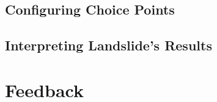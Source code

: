 \documentclass{article}
\begin{document}
\subsection{Configuring Choice Points}
\label{sec:choice}

\subsection{Interpreting Landslide's Results}

\section{Feedback}
\end{document}
